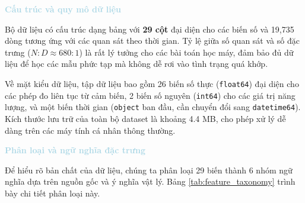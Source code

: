 \vspace{0.5em}
\noindent\textcolor{lightblue}{\textbf{Cấu trúc và quy mô dữ liệu}}
\vspace{0.5em}

Bộ dữ liệu có cấu trúc dạng bảng với \textbf{29 cột} đại diện cho các biến số và 19,735 dòng tương ứng với các quan sát theo thời gian. Tỷ lệ giữa số quan sát và số đặc trưng ($N:D \approx 680:1$) là rất lý tưởng cho các bài toán học máy, đảm bảo đủ dữ liệu để học các mẫu phức tạp mà không dễ rơi vào tình trạng quá khớp.

Về mặt kiểu dữ liệu, tập dữ liệu bao gồm 26 biến số thực (\texttt{float64}) đại diện cho các phép đo liên tục từ cảm biến, 2 biến số nguyên (\texttt{int64}) cho các giá trị năng lượng, và một biến thời gian (\texttt{object} ban đầu, cần chuyển đổi sang \texttt{datetime64}). Kích thước lưu trữ của toàn bộ dataset là khoảng 4.4 MB, cho phép xử lý dễ dàng trên các máy tính cá nhân thông thường.

\vspace{0.5em}
\noindent\textcolor{lightblue}{\textbf{Phân loại và ngữ nghĩa đặc trưng}}
\vspace{0.5em}

Để hiểu rõ bản chất của dữ liệu, chúng ta phân loại 29 biến thành 6 nhóm ngữ nghĩa dựa trên nguồn gốc và ý nghĩa vật lý. Bảng \ref{tab:feature_taxonomy} trình bày chi tiết phân loại này.

